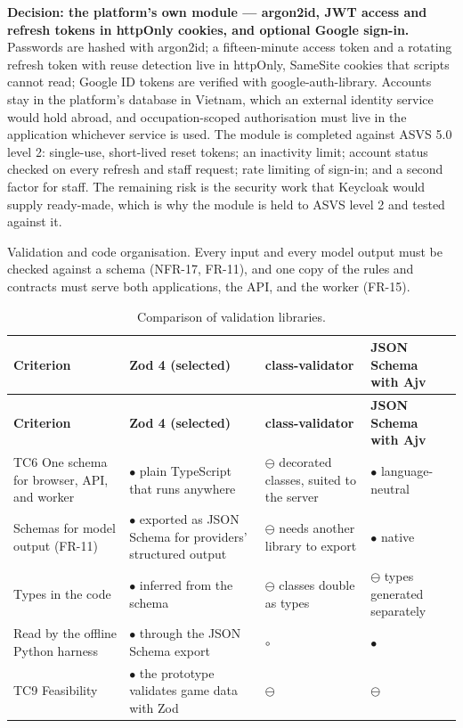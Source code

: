 \textbf{Decision: the platform's own module --- argon2id, JWT access and refresh tokens in httpOnly cookies, and optional Google sign-in.} Passwords are hashed with argon2id\cite{r155}; a fifteen-minute access token and a rotating refresh token with reuse detection\cite{r156} live in httpOnly, SameSite cookies that scripts cannot read; Google ID tokens are verified with google-auth-library. Accounts stay in the platform's database in Vietnam, which an external identity service would hold abroad, and occupation-scoped authorisation must live in the application whichever service is used. The module is completed against ASVS 5.0 level 2\cite{r157}: single-use, short-lived reset tokens; an inactivity limit; account status checked on every refresh and staff request; rate limiting of sign-in; and a second factor for staff. The remaining risk is the security work that Keycloak would supply ready-made, which is why the module is held to ASVS level 2 and tested against it.

Validation and code organisation. Every input and every model output must be checked against a schema (NFR-17, FR-11), and one copy of the rules and contracts must serve both applications, the API, and the worker (FR-15).

{\small
\begin{longtable}{|>{\raggedright\arraybackslash}p{}|>{\raggedright\arraybackslash}p{}|>{\raggedright\arraybackslash}p{}|>{\raggedright\arraybackslash}p{}|}
\caption{Comparison of validation libraries.} \\
\hline
\textbf{Criterion} & \textbf{Zod 4 (selected)} & \textbf{class-validator\cite{r188}} & \textbf{JSON Schema with Ajv\cite{r189}} \\ \hline
\endfirsthead
\hline
\textbf{Criterion} & \textbf{Zod 4 (selected)} & \textbf{class-validator\cite{r188}} & \textbf{JSON Schema with Ajv\cite{r189}} \\ \hline
\endhead
TC6 One schema for browser, API, and worker & $\bullet$ plain TypeScript that runs anywhere & $\ominus$ decorated classes, suited to the server & $\bullet$ language-neutral \\ \hline
Schemas for model output (FR-11) & $\bullet$ exported as JSON Schema for providers' structured output\cite{r190} & $\ominus$ needs another library to export & $\bullet$ native \\ \hline
Types in the code & $\bullet$ inferred from the schema & $\ominus$ classes double as types & $\ominus$ types generated separately \\ \hline
Read by the offline Python harness & $\bullet$ through the JSON Schema export & $\circ$ & $\bullet$ \\ \hline
TC9 Feasibility & $\bullet$ the prototype validates game data with Zod & $\ominus$ & $\ominus$ \\ \hline
\end{longtable}
}

